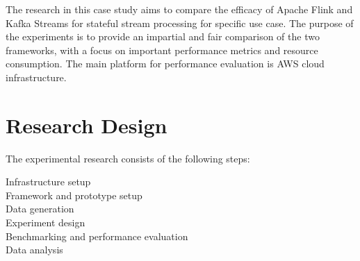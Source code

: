 The research in this case study aims to compare the
efficacy of Apache Flink and Kafka Streams for stateful stream processing for specific use case.
The purpose of the experiments is to provide an impartial
and fair comparison of the two frameworks, with a focus
on important performance metrics and resource consumption.
The main platform for performance evaluation is AWS cloud infrastructure.

\section{Research Design}\label{sec:research-design}
The experimental research consists of the following steps:

\begin{description}
    \item[Infrastructure setup]
    \item[Framework and prototype setup]
    \item[Data generation] 
    \item[Experiment design]
    \item[Benchmarking and performance evaluation]
    \item[Data analysis]
\end{description}